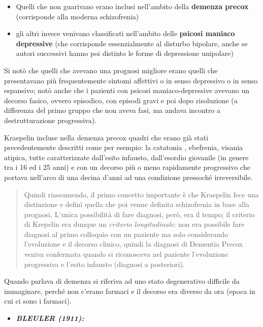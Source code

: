 \documentclass[]{article}
\begin{document}
\begin{itemize}
\item
  Quelli che non guarivano erano inclusi nell'ambito della
  \textbf{demenza precox} (corrisponde alla moderna schizofrenia)
\item
  gli altri invece venivano classificati nell'ambito delle
  \textbf{psicosi maniaco depressive} (che corrisponde essenzialmente al
  disturbo bipolare, anche se autori successivi hanno poi distinto le
  forme di depressione unipolare)
\end{itemize}

Si notò che quelli che avevano una prognosi migliore erano quelli che
presentavano più frequentemente sintomi affettivi o in senso depressivo
o in senso espansivo; notò anche che i pazienti con psicosi
maniaco-depressive avevano un decorso fasico, ovvero episodico, con
episodi gravi e poi dopo risoluzione (a differenza del primo gruppo che
non aveva fasi, ma andava incontro a destrutturazione progressiva).

Kraepelin incluse nella demenza precox quadri che erano già stati
precedentemente descritti come per esempio: la catatonia , ebefrenia,
visania atipica, tutte caratterizzate dall'esito infausto, dall'esordio
giovanile (in genere tra i 16 ed i 25 anni) e con un decorso più o meno
rapidamente progressivo che portava nell'arco di una decina d'anni ad
una condizione pressoché irreversibile.

\begin{quote}
Quindi riassumendo, il primo concetto importante è che Kraepelin fece
una distinzione e definì quella che poi venne definita schizofrenia in
base alla prognosi. L'unica possibilità di fare diagnosi, però, era il
tempo; il criterio di Krepelin era dunque un \emph{criterio
longitudinale}: non era possibile fare diagnosi al primo colloquio con
un paziente ma solo considerando l'evoluzione e il decorso clinico,
quindi la diagnosi di Dementia Precox veniva confermata quando si
riconosceva nel paziente l'evoluzione progressiva e l'esito infausto
(diagnosi a posteriori).
\end{quote}

Quando parlava di demenza si riferiva ad uno stato degenerativo
difficile da immaginare, perché non c'erano farmaci e il decorso era
diverso da ora (epoca in cui ci sono i farmaci).

\begin{itemize}
\item
  \textbf{\emph{BLEULER (1911):}}
\end{itemize}
\end{document}
